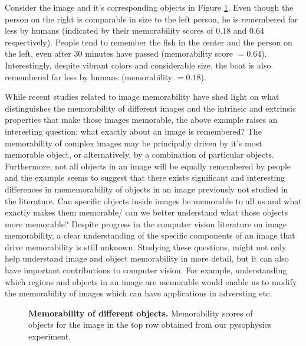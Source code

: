 Consider the image and it's corresponding objects in Figure \ref{fig:introPhoto}. Even though the person on the right is comparable in size to the left person, he is remembered far less by humans (indicated by their memorability scores of $0.18$ and $0.64$ respectively). People tend to remember the fish in the center and the person on the left, even after $30$ minutes have passed (memorability score $= 0.64$). Interestingly, despite vibrant colors and considerable size, the boat is also remembered far less by humans (memorability $= 0.18$).

While recent studies related to image memorability have shed light on what distinguishes the memorability of different images and the intrinsic and extrinsic properties that make those images memorable, the above example raises an interesting question: what exactly about an image is remembered? The memorability of complex images may be principally driven by it's most memorable object, or alternatively, by a combination of particular objects. Furthermore, not all objects in an image will be equally remembered by people and the example seems to suggest that there exists significant and interesting differences in mememorability of objects in an image previously not studied in the literature. Can specific objects inside images be memorable to all us and what exactly makes them memorable/ can we better understand what those objects more memorable? Despite progress in the computer vision literature on image memorability, a clear understanding of the specific components of an image that drive memorability is still unknown. Studying these questions, might not only help understand image and object memorability in more detail, but it can also have important contributions to computer vision. For example, understanding which regions and objects in an image are memorable would enable us to modify the memorability of images which can have applications in adversting etc.

\begin{figure}[t]
\centering
{}

\vspace{-3mm}

\vspace{-5mm}\caption{\footnotesize\textbf{Memorability of different objects.} Memorability scores of objects for the image in the top row obtained from our pysophysics experiment. }\label{fig:introPhoto}
\end{figure}

